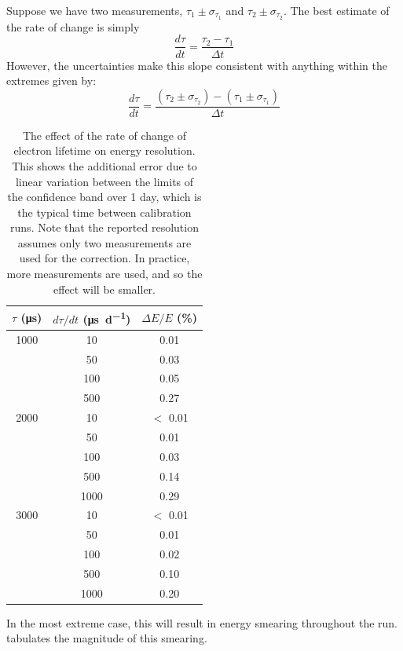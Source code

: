 \documentclass[herrin-thesis.tex]{subfiles}
\begin{document}
Suppose we have two measurements, \(\tau_1 \pm \sigma_{\tau_1}\) and \(\tau_2 \pm \sigma_{\tau_2}\). The best estimate of the rate of change is simply
\[\frac{d\tau}{dt} = \frac{\tau_2 - \tau_1}{\Delta t}\]
However, the uncertainties make this slope consistent with anything within the extremes given by:
\[\frac{d\tau}{dt} = \frac{(\tau_2 \pm \sigma_{\tau_2}) - (\tau_1 \pm \sigma_{\tau_1})}{\Delta t}\]

\begin{table}[htd]
\centering
\begin{tabular}{c|c|c}
	\(\tau\) (\si{\micro\second})	&	\(d\tau/dt\) (\si{\micro\second\per\day})	&	\(\Delta E / E\) (\%) 	\\ \hline
	1000					&	10			&	0.01				\\
						&	50			&	0.03				\\
						&	100			&	0.05				\\
						&	500			&	0.27				\\ \hline
	2000					&	10			&	\(<\) 0.01			\\
						&	50			&	0.01				\\
						&	100			&	0.03				\\
						&	500			&	0.14				\\
						&	1000			&	0.29				\\ \hline
	3000					&	10			&	\(<\) 0.01			\\
						&	50			&	0.01				\\
						&	100			&	0.02				\\
						&	500			&	0.10				\\
						&	1000			&	0.20						
\end{tabular}
\caption[Electron lifetime time variance effect on resolution]{The effect of the rate of change of electron lifetime on energy resolution. This shows the additional error due to linear variation between the limits of the confidence band over 1 day, which is the typical time between calibration runs. Note that the reported resolution assumes only two measurements are used for the correction. In practice, more measurements are used, and so the effect will be smaller.}
\label{tab:el_res_dtaudt}
\end{table}

In the most extreme case, this will result in energy smearing throughout the run.  tabulates the magnitude of this smearing.
\end{document}
